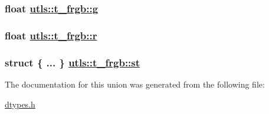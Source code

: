 \hypertarget{unionutls_1_1t__frgb_d9307f34addd7093644c76bdc0ca4818}{
\subsubsection[g]{\setlength{\rightskip}{0pt plus 5cm}float \hyperlink{unionutls_1_1t__frgb_d9307f34addd7093644c76bdc0ca4818}{utls::t\_\-frgb::g}}}
\label{unionutls_1_1t__frgb_d9307f34addd7093644c76bdc0ca4818}


\hypertarget{unionutls_1_1t__frgb_09ce4de35bbd5e9bebb90a573d25a93e}{
\subsubsection[r]{\setlength{\rightskip}{0pt plus 5cm}float \hyperlink{unionutls_1_1t__frgb_09ce4de35bbd5e9bebb90a573d25a93e}{utls::t\_\-frgb::r}}}
\label{unionutls_1_1t__frgb_09ce4de35bbd5e9bebb90a573d25a93e}


\hypertarget{unionutls_1_1t__frgb_8356428ed028c1670bfb822c4282db10}{
\subsubsection[st]{\setlength{\rightskip}{0pt plus 5cm}struct \{ ... \}     \hyperlink{unionutls_1_1t__frgb_8356428ed028c1670bfb822c4282db10}{utls::t\_\-frgb::st}}}
\label{unionutls_1_1t__frgb_8356428ed028c1670bfb822c4282db10}




The documentation for this union was generated from the following file:\begin{CompactItemize}
\item 
\hyperlink{dtypes_8h}{dtypes.h}\end{CompactItemize}

